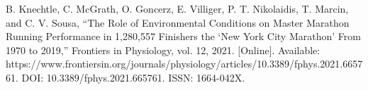 \documentclass[conference]{IEEEtran}
\begin{document}
\begin{thebibliography}{00}
 B. Knechtle, C. McGrath, O. Goncerz, E. Villiger, P. T. Nikolaidis, T. Marcin, and C. V. Sousa, ``The Role of Environmental Conditions on Master Marathon Running Performance in 1,280,557 Finishers the ‘New York City Marathon’ From 1970 to 2019,'' Frontiers in Physiology, vol. 12, 2021. [Online]. Available: https://www.frontiersin.org/journals/physiology/articles/10.3389/fphys.2021.665761. DOI: 10.3389/fphys.2021.665761. ISSN: 1664-042X.


\end{thebibliography}
\vspace{12pt}
\end{document}
